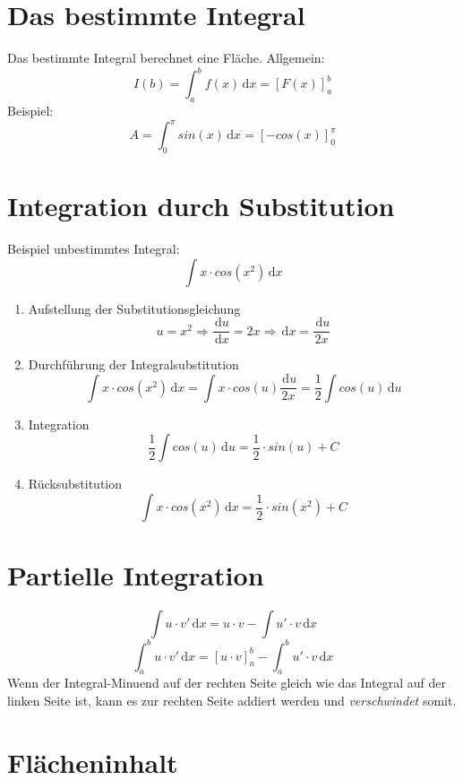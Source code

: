 \section{Das bestimmte Integral} %
\label{sub:das_bestimmte_integral}
Das bestimmte Integral berechnet eine Fläche.\newline
Allgemein:
\[ I(b) = \int_a^b f(x) \,\mathrm{d}x = [F(x)]_a^b \]
Beispiel:
\[ A = \int_0^{\pi} sin(x)\,\mathrm{d}x = [-cos(x)]_0^{\pi} \]

\section{Integration durch Substitution} %
\label{sec:integration_durch_substitution}
Beispiel unbestimmtes Integral:
\[ \int x \cdot cos(x^2)\,\mathrm{d}x\]
\begin{enumerate}
	\item Aufstellung der Substitutionsgleichung
	\[u = x^2 \Rightarrow \frac{\,\mathrm{d}u}{\,\mathrm{d}x} = 2x \Rightarrow \,\mathrm{d}x = \frac{\,\mathrm{d}u}{2x} \]
	\item Durchführung der Integralsubstitution
	\[\int x \cdot cos(x^2)\,\mathrm{d}x = \int x \cdot cos(u) \frac{\,\mathrm{d}u}{2x} = \frac{1}{2} \int cos(u)\,\mathrm{d}u \]
	\item Integration
	\[\frac{1}{2} \int cos(u)\,\mathrm{d}u = \frac{1}{2} \cdot sin(u) + C\]
	\item Rücksubstitution
	\[ \int x \cdot cos(x^2)\,\mathrm{d}x = \frac{1}{2} \cdot sin(x^2) + C\]
\end{enumerate}

\section{Partielle Integration} %
\label{sec:partielle_integration}
\[ \int u \cdot v'\,\mathrm{d}x = u \cdot v - \int u' \cdot v\,\mathrm{d}x \]
\[ \int_a^b u \cdot v'\,\mathrm{d}x = [u \cdot v]_a^b - \int_a^b u' \cdot v\,\mathrm{d}x \]
Wenn der Integral-Minuend auf der rechten Seite gleich wie das Integral auf der linken Seite ist, kann es zur rechten Seite addiert werden und \emph{verschwindet} somit.

\section{Flächeninhalt} %
\label{sec:flächeninhalt}
